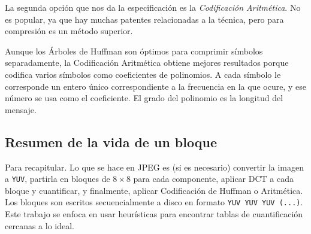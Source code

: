 La segunda opción que nos da la especificación es la \emph{Codificación
Aritmética}. No es popular, ya que hay muchas patentes relacionadas a la
técnica, pero para compresión es un método superior.

Aunque los Árboles de Huffman son óptimos para comprimir símbolos
separadamente, la Codificación Aritmética obtiene mejores resultados porque
codifica varios símbolos como coeficientes de polinomios. A cada símbolo le
corresponde un entero único correspondiente a la frecuencia en la que ocure, y
ese número se usa como el coeficiente. El grado del polinomio es la longitud
del mensaje.

\subsection{Resumen de la vida de un bloque}

Para recapitular. Lo que se hace en JPEG es (si es necesario) convertir la
imagen a \verb+YUV+, partirla en bloques de $8\times8$ para cada componente,
aplicar DCT a cada bloque y cuantificar, y finalmente, aplicar Codificación de
Huffman o Aritmética. Los bloques son escritos secuencialmente a disco en
formato \verb+YUV YUV YUV (...)+. Este trabajo se enfoca en usar heurísticas
para encontrar tablas de cuantificación cercanas a lo ideal.

%
